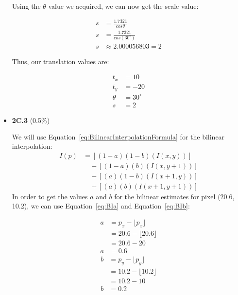\documentclass{article}
\begin{document}
\begin{itemize}
						Using the $\theta$ value we acquired, we can now get the scale value:


						\begin{align*}
							s & = \frac{1.7321}{cos\theta} \\
							s & = \frac{1.7321}{cos(30^{\circ})} \\
							s & \approx 2.000056803 = 2
						\end{align*}

						Thus, our translation values are:

						
						\begin{align*}
							t_x    & = 10 \\
							t_y    & = -20 \\
							\theta & = 30^{\circ} \\
							s & = 2
						\end{align*}


		\item{\textbf{2C.3} (0.5\%)}


			We will use {Equation~\ref{eq:BilinearInterpolationFormula}} for the bilinear interpolation:
			\begin{equation}
				\begin{split}
    				I(p) &= [(1-a)(1-b)(I(x,y))] \\
    				&\quad+ [(1-a)(b)(I(x,y+1))] \\
    				&\quad+ [(a)(1-b)(I(x+1,y))] \\
    				&\quad+ [(a)(b)(I(x+1,y+1))]
				\end{split}
				\label{eq:BilinearInterpolationFormula}
			\end{equation}
			In order to get the values $a$ and $b$ for the bilinear estimates for pixel (20.6, 10.2), we can use {Equation~\ref{eq:BIa}} and {Equation~\ref{eq:BIb}}:

			\begin{equation}
				\begin{split}
				  a & = p_x - \lfloor p_x \rfloor \\
				   & = 20.6 - \lfloor 20.6 \rfloor \\
				   & = 20.6 - 20 \\
				  a & = 0.6
				\end{split}
				\label{eq:BIa}
			\end{equation}
			\begin{equation}
				\begin{split}
				  b & = p_y - \lfloor p_y \rfloor \\
				   & = 10.2 - \lfloor 10.2 \rfloor \\
				   & = 10.2 - 10 \\
				  b & = 0.2
				\end{split}
				\label{eq:BIb}
			\end{equation}


\end{itemize}
\end{document}

